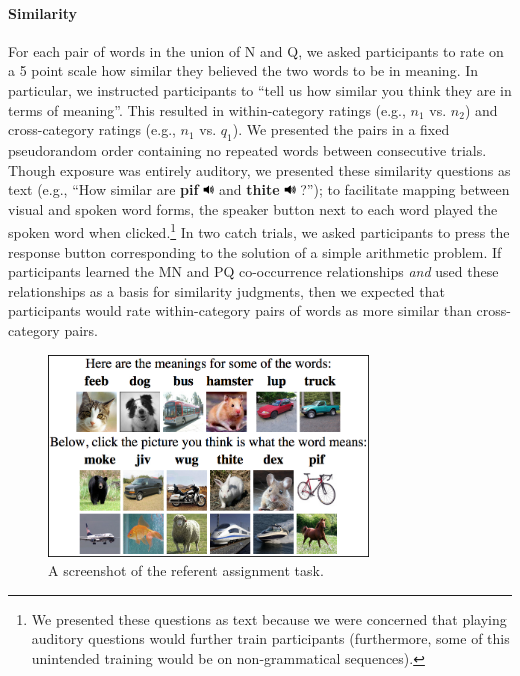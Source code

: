 \documentclass[man,floatsintext]{apa6}
\begin{document}
\paragraph{Similarity}
For each pair of words in the union of N and Q, we asked participants to rate on a 5 point scale how similar they believed the two words to be in meaning. In particular, we instructed participants to  ``tell us how similar you think they are in terms of meaning''. This resulted in within-category ratings (e.g., $n_1$ vs. $n_2$) and cross-category ratings (e.g., $n_1$ vs. $q_1$). We presented the pairs in a fixed pseudorandom order containing no repeated words between consecutive trials. Though exposure was entirely auditory, we presented these similarity questions as text (e.g., ``How similar are \textbf{pif} \includegraphics[width=0.3cm]{play.png} and \textbf{thite} \includegraphics[width=0.3cm]{play.png} ?''); to facilitate mapping between visual and spoken word forms, the speaker button next to each word played the spoken word when clicked.\footnote{ We presented these questions as text because we were concerned that playing auditory questions would further train participants (furthermore, some of this unintended training would be on non-grammatical sequences).} In two catch trials, we asked participants to press the response button corresponding to the solution of a simple arithmetic problem. If participants learned the MN and PQ co-occurrence relationships \emph{and} used these relationships as a basis for similarity judgments, then we expected that participants would rate within-category pairs of words as more similar than cross-category pairs.

\begin{figure}[t]
  \begin{center}
    \includegraphics[width=8.5cm]{meaning-html-cropped.png}
    \caption{A screenshot of the referent assignment task.}
    \label{meaning-task}
  \end{center}
\end{figure}
\end{document}
